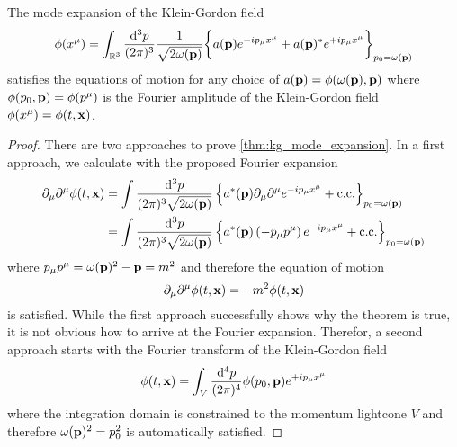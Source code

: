 \begin{theorem}\label{thm:kg_mode_expansion}
	The mode expansion of the Klein-Gordon field
	\begin{equation}
		\phi(x^\mu)
		=
		\int_{\mathbb{R}^3}\frac{\dd[3]{p}}{(2\pi)^3}
		\frac{1}{\sqrt{2\omega(\vb{p})}}
		\biggl\{
			a(\vb{p})
			e^{-ip_\mu x^\mu}
			+
			a(\vb{p})^*
			e^{+ip_\mu x^\mu}
		\biggr\}_{p_0=\omega(\vb{p})}
		\label{eq:kg_mode_expansion}
	\end{equation}
	satisfies the equations of motion for any choice of $a(\vb{p})=\phi(\omega(\vb{p}),\vb{p})$ where $\phi(p_0,\vb{p})=\phi(p^\mu)$ is the Fourier amplitude of the Klein-Gordon field $\phi(x^\mu)=\phi(t,\vb{x})$.
\end{theorem}
\begin{proof}
	There are two approaches to prove \cref{thm:kg_mode_expansion}.
	In a first approach, we calculate with the proposed Fourier expansion
	\begin{equation*}
		\begin{split}
			\partial_\mu
			\partial^\mu
			\phi(t,\vb{x})
			&=
			\int\frac{\dd[3]{p}}{(2\pi)^3\sqrt{2\omega(\vb{p})}}
			\left\{
				a^*(\vb{p})
				\partial_\mu
				\partial^\mu
				e^{-ip_\mu x^\mu}
				+
				\text{c.c.}
			\right\}_{p_0=\omega(\vb{p})}
			\\
			&=
			\int\frac{\dd[3]{p}}{(2\pi)^3\sqrt{2\omega(\vb{p})}}
			\left\{
				a^*(\vb{p})
				\left(
					-
					p_\mu
					p^\mu
				\right)
				e^{-ip_\mu x^\mu}
				+
				\text{c.c.}
			\right\}_{p_0=\omega(\vb{p})}
		\end{split}
	\end{equation*}
	where $p_\mu p^\mu=\omega(\vb{p})^2-\vb{p}=m^2$ and therefore the equation of motion
	\begin{equation*}
			\partial_\mu
			\partial^\mu
			\phi(t,\vb{x})
			=
			-
			m^2
			\phi(t,\vb{x})
	\end{equation*}
	is satisfied.
	While the first approach successfully shows why the theorem is true, it is not obvious how to arrive at the Fourier expansion.
	Therefor, a second approach starts with the Fourier transform of the Klein-Gordon field
	\begin{equation*}
		\phi(t,\vb{x})
		=
		\int_V\frac{\dd[4]{p}}{(2\pi)^4}
		\phi(p_0,\vb{p})
		e^{+ip_\mu x^\mu}
	\end{equation*}
	where the integration domain is constrained to the momentum lightcone $V$ and therefore $\omega(\vb{p})^2=p_0^2$ is automatically satisfied.

\end{proof}
